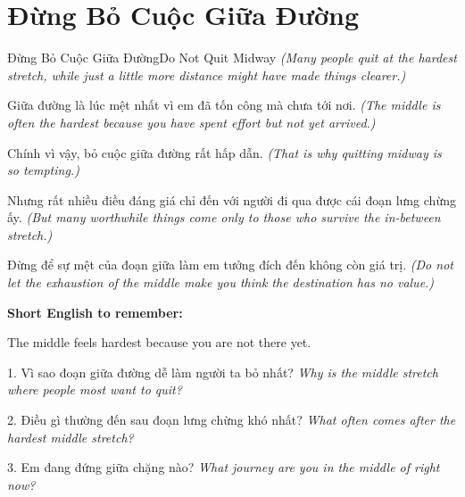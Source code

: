 \section{Đừng Bỏ Cuộc Giữa Đường}
\begin{truyen}{Đừng Bỏ Cuộc Giữa Đường}{Do Not Quit Midway}
\textit{(Many people quit at the hardest stretch, while just a little more distance might have made things clearer.)}

Giữa đường là lúc mệt nhất vì em đã tốn công mà chưa tới nơi.
\textit{(The middle is often the hardest because you have spent effort but not yet arrived.)}

Chính vì vậy, bỏ cuộc giữa đường rất hấp dẫn.
\textit{(That is why quitting midway is so tempting.)}

Nhưng rất nhiều điều đáng giá chỉ đến với người đi qua được cái đoạn lưng chừng ấy.
\textit{(But many worthwhile things come only to those who survive the in-between stretch.)}
\end{truyen}

\begin{baihoc}
Đừng để sự mệt của đoạn giữa làm em tưởng đích đến không còn giá trị.
\textit{(Do not let the exhaustion of the middle make you think the destination has no value.)}
\end{baihoc}

\begin{ghinhoanh}
\textbf{Short English to remember:}

The middle feels hardest because you are not there yet.

\end{ghinhoanh}

\begin{tuhocnhanh}
1. Vì sao đoạn giữa đường dễ làm người ta bỏ nhất? \textit{Why is the middle stretch where people most want to quit?}

2. Điều gì thường đến sau đoạn lưng chừng khó nhất? \textit{What often comes after the hardest middle stretch?}

3. Em đang đứng giữa chặng nào? \textit{What journey are you in the middle of right now?}
\end{tuhocnhanh}
\ngancach

